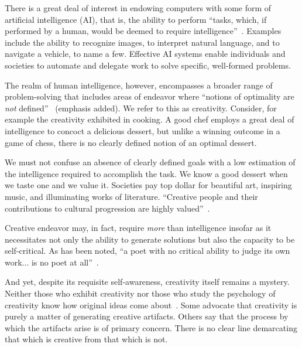 \documentclass[11pt,phd]{byuprop}
\begin{document}

There is a great deal of interest in endowing computers with some form of artificial intelligence (AI), that is, the ability to perform ``tasks, which, if performed by a human, would be deemed to require intelligence''~\cite{wiggins2006preliminary}. Examples include the ability to recognize images, to interpret natural language, and to navigate a vehicle, to name a few. Effective AI systems enable individuals and societies to automate and delegate work to solve specific, well-formed problems.

The realm of human intelligence, however, encompasses a broader range of problem-solving that includes areas of endeavor where ``notions of optimality are \emph{not} defined''~\cite{eigenfeldt2012evaluating} (emphasis added). We refer to this as creativity. Consider, for example the creativity exhibited in cooking. A good chef employs a great deal of intelligence to concoct a delicious dessert, but unlike a winning outcome in a game of chess, there is no clearly defined notion of an optimal dessert.


We must not confuse an absence of clearly defined goals with a low estimation of the intelligence required to accomplish the task. We know a good dessert when we taste one and we value it. Societies pay top dollar for beautiful art, inspiring music, and illuminating works of literature. ``Creative people and their contributions to cultural progression are highly valued''~\cite{colton2012computational}.

Creative endeavor may, in fact, require \emph{more} than intelligence insofar as it necessitates not only the ability to generate solutions but also the capacity to be self-critical. As has been noted, ``a poet with no critical ability to judge its own work... is no poet at all''~\cite{colton2012computational}.

And yet, despite its requisite self-awareness, creativity itself remains a mystery. Neither those who exhibit creativity nor those who study the psychology of creativity know how original ideas come about~\cite{johnson1991jazz,boden2004creative}. Some advocate that creativity is purely a matter of generating creative artifacts. Others say that the process by which the artifacts arise is of primary concern. There is no clear line demarcating that which is creative from that which is not.
\end{document}
